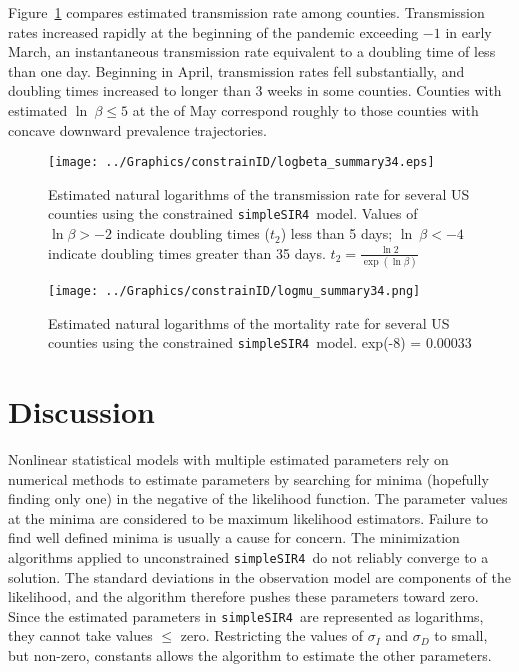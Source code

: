 \documentclass[12pt,letterpaper]{article}
\newcommand\help[1]{\color{Magenta}{\it #1 }\normalcolor}
\newcommand\SSm{{\tt simpleSIR4}}
\begin{document}
Figure~\ref{fig:xrates} compares estimated transmission rate among
counties.
Transmission rates increased rapidly at the beginning of the pandemic
exceeding  $-1$ in early March, an instantaneous transmission rate equivalent to a 
doubling time of less than one day.
Beginning in April, transmission rates fell substantially, and doubling times
increased to longer than 3 weeks in some counties.
Counties with estimated $\ln~ \beta \le 5$ at the of May
correspond roughly to those counties with concave downward prevalence
trajectories.


\begin{figure}
\begin{center}
\texttt{[image: ../Graphics/constrainID/logbeta\_summary34.eps]}\\
\end{center}
\caption{\label{fig:xrates}
Estimated natural logarithms of the transmission rate for several US counties using the
constrained \SSm\ model.
Values of $\ln \beta > -2$ indicate doubling times ($t_2$) less than 5 days;
$\ln~ \beta < -4$ indicate doubling times greater than 35 days.
$t_2 = \frac{\ln 2}{\exp(\ln \beta)}$
}
\end{figure}

\begin{figure}
\begin{center}
\texttt{[image: ../Graphics/constrainID/logmu\_summary34.png]}\\
\end{center}
\caption{\label{fig:drates}
Estimated natural logarithms of the mortality rate for several US counties using the
constrained \SSm\ model.
exp(-8) = 0.00033
\help{Remove ToNY, Tompkins Co NY}
}
\end{figure}

\section*{Discussion}

Nonlinear statistical models with multiple estimated parameters rely
on numerical methods to estimate parameters by searching for minima
(hopefully finding only one) in the negative of the likelihood
function. The parameter values at the minima are considered to be
maximum likelihood estimators. Failure to find well defined minima is
usually a cause for concern. The minimization algorithms applied to
unconstrained \SSm\ do not reliably converge to a solution. The
standard deviations in the observation model are components of the
likelihood, and the algorithm therefore pushes these parameters toward zero.
Since the estimated parameters in \SSm\ are represented as logarithms,
they cannot take values $\le$ zero. Restricting the values of
$\sigma_I$ and $\sigma_D$ to small, but non-zero, constants allows the
algorithm to estimate the other parameters.
\end{document}
